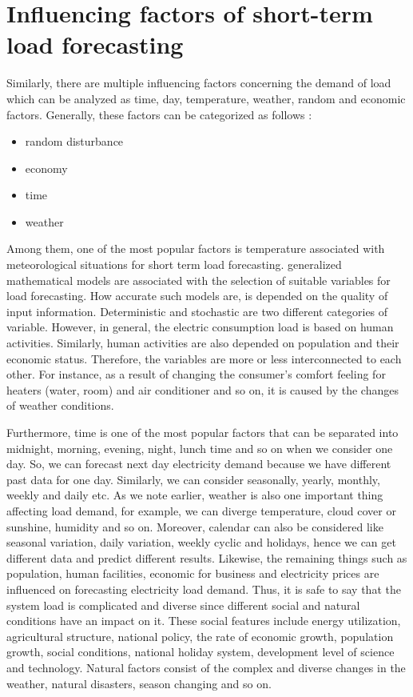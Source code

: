 \section{Influencing factors of short-term load forecasting}
\par  Similarly, there are multiple influencing factors concerning the demand of load which can be analyzed as time, day, temperature, weather, random and economic factors. Generally, these factors can be categorized as follows \cite{pardo2002temperature}:
\begin{itemize}
    \item random disturbance  
    \item economy 
    \item time
    \item weather
\end{itemize}
\par Among them, one of the most popular factors is temperature associated with meteorological situations for short term load forecasting. generalized mathematical models are associated with the selection of suitable variables for load forecasting. How accurate such models are, is depended on the quality of input information. Deterministic and stochastic are two different categories of variable. However, in general, the electric consumption load is based on human activities. Similarly, human activities are also depended on population and their economic status. Therefore, the variables are more or less interconnected to each other. For instance, as a result of changing the consumer’s comfort feeling for heaters (water, room) and air conditioner and so on, it is caused by the changes of weather conditions. 
\par Furthermore, time is one of the most popular factors that can be separated into midnight, morning, evening, night, lunch time and so on when we consider one day. So, we can forecast next day electricity demand because we have different past data for one day. Similarly, we can consider seasonally, yearly, monthly, weekly and daily etc. As we note earlier, weather is also one important thing affecting load demand, for example, we can diverge temperature, cloud cover or sunshine, humidity and so on. Moreover, calendar can also be considered like seasonal variation, daily variation, weekly cyclic and holidays, hence we can get different data and predict different results. Likewise, the remaining things such as population, human facilities, economic for business and electricity prices are influenced on forecasting electricity load demand. Thus, it is safe to say that the system load is complicated and diverse since different social and natural conditions have an impact on it. These social features include energy utilization, agricultural structure, national policy, the rate of economic growth, population growth, social conditions, national holiday system, development level of science and technology. Natural factors consist of the complex and diverse changes in the weather, natural disasters, season changing and so on.
